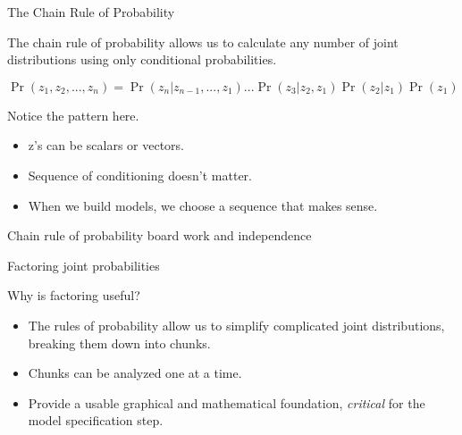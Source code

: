 \documentclass[ignorenonframetext,]{beamer}
\providecommand{\tightlist}{%
  \setlength{\itemsep}{0pt}\setlength{\parskip}{0pt}}
\begin{document}
\begin{frame}{The Chain Rule of Probability}

The chain rule of probability allows us to calculate any number of joint
distributions using only conditional probabilities. \vspace{1cm}

\(\Pr(z_1,z_2,...,z_n) = \Pr(z_n|z_{n-1},...,z_1) ... \Pr(z_3|z_2,z_1)\Pr(z_2|z_1)\Pr(z_1)\)

\vspace{1cm} Notice the pattern here.

\begin{itemize}
\tightlist
\item
  z's can be scalars or vectors.
\item
  Sequence of conditioning doesn't matter.
\item
  When we build models, we choose a sequence that makes sense.
\end{itemize}

\end{frame}

\begin{frame}{}

Chain rule of probability board work and independence

\end{frame}

\begin{frame}{Factoring joint probabilities}

Why is factoring useful?

\begin{itemize}
\tightlist
\item
  The rules of probability allow us to simplify complicated joint
  distributions, breaking them down into chunks.
\item
  Chunks can be analyzed one at a time.
\item
  Provide a usable graphical and mathematical foundation,
  \emph{critical} for the model specification step.
\end{itemize}

\end{frame}
\end{document}
